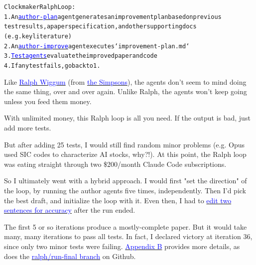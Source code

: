\documentclass[12pt]{article}
\begin{document}
\begin{mdframed}[
linewidth=1pt,
linecolor=black,
innerleftmargin=0.25em,
innerrightmargin=0.25em,
innertopmargin=0.2\baselineskip,
innerbottommargin=0.8\baselineskip
]
\begin{mdframed}[backgroundcolor=gray!10,linewidth=0.6pt,linecolor=gray!70,roundcorner=2pt,innerleftmargin=0.6em,innerrightmargin=0.6em,innertopmargin=0.5\baselineskip,innerbottommargin=0.5\baselineskip]
\begingroup
\small
\setlength{\parindent}{0pt}
\setlength{\parskip}{0pt}
\begin{alltt}

Clockmaker Ralph Loop:
    1. An \href{https://github.com/chenandrewy/ralph-wiggum-asset-pricing/blob/main/ralph/author-plan.py}{\textcolor{blue}{author-plan}} agent generates an improvement plan based on previous 
       test results, a paper specification, and other supporting docs 
       (e.g. key literature)
    2. An \href{https://github.com/chenandrewy/ralph-wiggum-asset-pricing/blob/main/ralph/author-improve.py}{\textcolor{blue}{author-improve}} agent executes `improvement-plan.md`
    3. \href{https://github.com/chenandrewy/ralph-wiggum-asset-pricing/tree/main/tests}{\textcolor{blue}{Test agents}} evaluate the improved paper and code 
    4. If any test fails, go back to 1.
\end{alltt}
\endgroup
\end{mdframed}

Like \href{https://en.wikipedia.org/wiki/Ralph_Wiggum}{\textcolor{blue}{Ralph Wiggum}} (from \href{https://en.wikipedia.org/wiki/The_Simpsons}{\textcolor{blue}{the Simpsons}}), the agents don't seem to mind doing the same thing, over and over again. Unlike Ralph, the agents won't keep going unless you feed them money.

With unlimited money, this Ralph loop is all you need. If the output is bad, just add more tests.

But after adding 25 tests, I would still find random minor problems (e.g. Opus used SIC codes to characterize AI stocks, why?!). At this point, the Ralph loop was eating straight through two \$200/month Claude Code subscriptions.

So I ultimately went with a hybrid approach. I would first "set the direction" of the loop, by running the author agents five times, independently. Then I'd pick the best draft, and initialize the loop with it. Even then, I had to \href{https://github.com/chenandrewy/ralph-wiggum-asset-pricing/commit/4bed451b406d6c1190ef42e33517946c980d822d}{\textcolor{blue}{edit two sentences for accuracy}} after the run ended.

The first 5 or so iterations produce a mostly-complete paper. But it would take many, many iterations to pass all tests. In fact, I declared victory at iteration 36, since only two minor tests were failing. \hyperref[appendix:iter-log]{\textcolor{blue}{Appendix B}} provides more details, as does the \href{https://github.com/chenandrewy/ralph-wiggum-asset-pricing/commits/ralph/run-final/}{\textcolor{blue}{ralph/run-final branch}} on Github.


\end{mdframed}
\end{document}
